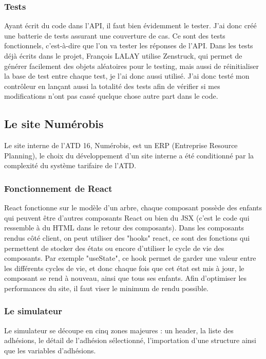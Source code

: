 \documentclass[a4paper,12pt]{report}
\begin{document}
\subsubsection{Tests}
Ayant écrit du code dans l'API, il faut bien évidemment le tester. J'ai donc créé une batterie de tests assurant une couverture de cas. Ce sont des tests fonctionnels, c'est-à-dire que l'on va tester les réponses de l'API. Dans les tests déjà écrits dans le projet, François LALAY utilise Zenstruck, qui permet de générer facilement des objets aléatoires pour le testing, mais aussi de réinitialiser la base de test entre chaque test, je l'ai donc aussi utilisé. J'ai donc testé mon contrôleur en lançant aussi la totalité des tests afin de vérifier si mes modifications n'ont pas cassé quelque chose autre part dans le code.

\subsection{Le site Numérobis}
Le site interne de l'ATD 16, Numérobis, est un ERP (Entreprise Resource Planning), le choix du développement d'un site interne a été conditionné par la complexité du système tarifaire de l'ATD.

\subsubsection{Fonctionnement de React}
React fonctionne sur le modèle d'un arbre, chaque composant possède des enfants qui peuvent être d'autres composants React ou bien du JSX (c'est le code qui ressemble à du HTML dans le retour des composants). Dans les composants rendus côté client, on peut utiliser des "hooks" react, ce sont des fonctions qui permettent de stocker des états ou encore d'utiliser le cycle de vie des composants. Par exemple "useState", ce hook permet de garder une valeur entre les différents cycles de vie, et donc chaque fois que cet état est mis à jour, le composant se rend à nouveau, ainsi que tous ses enfants. Afin d'optimiser les performances du site, il faut viser le minimum de rendu possible.

\subsubsection{Le simulateur}

Le simulateur se découpe en cinq zones majeures : un header, la liste des adhésions, le détail de l'adhésion sélectionné, l'importation d'une structure ainsi que les variables d'adhésions.
\end{document}
